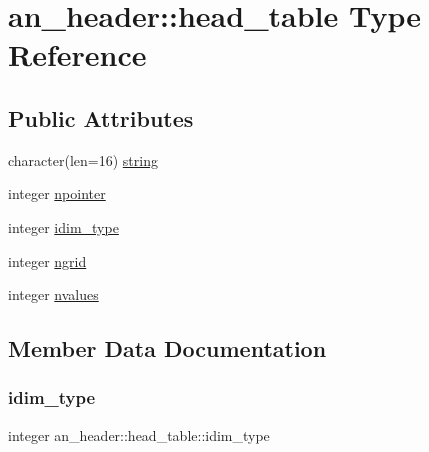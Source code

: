 \hypertarget{structan__header_1_1head__table}{}\section{an\+\_\+header\+:\+:head\+\_\+table Type Reference}
\label{structan__header_1_1head__table}
\subsection*{Public Attributes}
\begin{DoxyCompactItemize}
\item 
character(len=16) \hyperlink{structan__header_1_1head__table_a1be9d5f56131baf037a9da190f74189e}{string}
\item 
integer \hyperlink{structan__header_1_1head__table_ad73cf9ac7e4131420e4303aa425b183f}{npointer}
\item 
integer \hyperlink{structan__header_1_1head__table_a2c0e5e1896dce4260004d928663c8861}{idim\+\_\+type}
\item 
integer \hyperlink{structan__header_1_1head__table_acc79dab7891f45424b13bf4f0f179585}{ngrid}
\item 
integer \hyperlink{structan__header_1_1head__table_a75d0ca98f45425fdb8df177b5c2458e5}{nvalues}
\end{DoxyCompactItemize}


\subsection{Member Data Documentation}
\mbox{\label{structan__header_1_1head__table_a2c0e5e1896dce4260004d928663c8861}} 
\subsubsection{\texorpdfstring{idim\+\_\+type}{idim\_type}}
{\footnotesize\ttfamily integer an\+\_\+header\+::head\+\_\+table\+::idim\+\_\+type}

\mbox{\label{structan__header_1_1head__table_acc79dab7891f45424b13bf4f0f179585}} 
